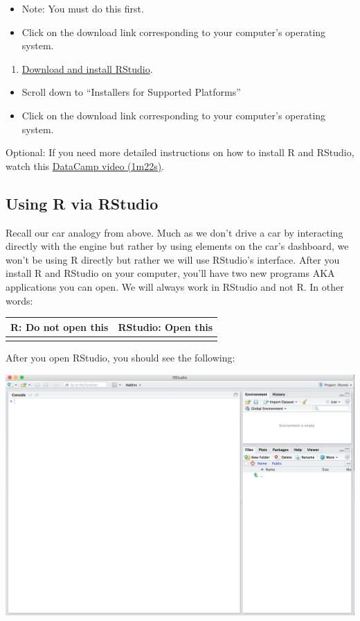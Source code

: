 \documentclass[
]{book}
\providecommand{\tightlist}{%
  \setlength{\itemsep}{0pt}\setlength{\parskip}{0pt}}
\begin{document}
\begin{itemize}
\tightlist
\item
  Note: You must do this first.
\item
  Click on the download link corresponding to your computer's operating system.
\end{itemize}

\begin{enumerate}
\def\labelenumi{\arabic{enumi}.}
\tightlist
\item
  \href{https://www.rstudio.com/products/rstudio/download3/}{Download and install RStudio}.
\end{enumerate}

\begin{itemize}
\tightlist
\item
  Scroll down to ``Installers for Supported Platforms''
\item
  Click on the download link corresponding to your computer's operating system.
\end{itemize}

Optional: If you need more detailed instructions on how to install R and RStudio, watch this \href{https://campus.datacamp.com/courses/working-with-the-rstudio-ide-part-1/orientation?ex=3}{DataCamp video (1m22s)}.

\hypertarget{using-r-via-rstudio}{%
\subsection{Using R via RStudio}\label{using-r-via-rstudio}}

Recall our car analogy from above. Much as we don't drive a car by interacting directly with the engine but rather by using elements on the car's dashboard, we won't be using R directly but rather we will use RStudio's interface. After you install R and RStudio on your computer, you'll have two new programs AKA applications you can open. We will always work in RStudio and not R. In other words:

\begin{longtable}[]{@{}cc@{}}
\toprule
R: Do not open this & RStudio: Open this\tabularnewline
\midrule
\endhead
&\tabularnewline
\bottomrule
\end{longtable}

After you open RStudio, you should see the following:

\includegraphics{images/rstudio.png}
\end{document}
